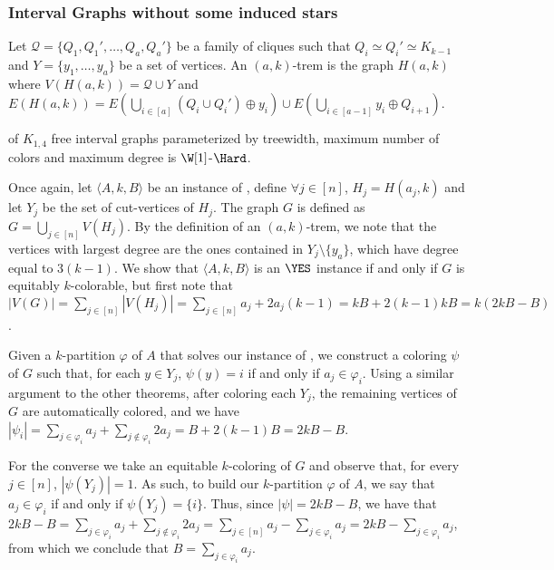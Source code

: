 \subsubsection{Interval Graphs without some induced stars}


\begin{definition}
    Let $\mathcal{Q} = \{Q_1, Q_1', \dots, Q_a, Q_a'\}$ be a family of cliques such that $Q_i \simeq Q_i' \simeq K_{k-1}$ and $Y = \{y_1, \dots, y_a\}$ be a set of vertices.
    An $(a,k)$-trem is the graph $H(a,k)$ where $V\left(H(a,k)\right) = \mathcal{Q} \cup Y$ and $E\left(H(a,k)\right) = E\left(\bigcup_{i \in [a]} (Q_i \cup Q_i') \oplus y_i\right) \cup E\left(\bigcup_{i \in [a-1]} y_i \oplus Q_{i+1}\right)$.
\end{definition}

\begin{theorem}
    \label{thm:chordal_w1_hard}
     of $K_{1,4}$ free interval graphs parameterized by treewidth, maximum number of colors and maximum degree is $\W[1]$-$\Hard$.
\end{theorem}

\begin{tproof}
    Once again, let $\langle A,k,B\rangle$ be an instance of , define $\forall j \in [n]$, $H_j = H(a_j, k)$ and let $Y_j$ be the set of cut-vertices of $H_j$.
    The graph $G$ is defined as $G = \bigcup_{j \in [n]} V(H_j)$.
    By the definition of an $(a,k)$-trem, we note that the vertices with largest degree are the ones contained in $Y_j \setminus \{y_a\}$, which have degree equal to $3(k-1)$.
    We show that $\langle A,k,B\rangle$ is an $\YES$ instance if and only if $G$ is equitably $k$-colorable, but first note that $|V(G)| = \sum_{j \in [n]} |V(H_j)| = \sum_{j \in [n]} a_j + 2a_j(k-1) = kB + 2(k-1)kB = k(2kB - B)$.
    
    Given a $k$-partition $\varphi$ of $A$ that solves our instance of , we construct a coloring $\psi$ of $G$ such that, for each $y \in Y_j$, $\psi(y) = i$ if and only if $a_j \in \varphi_i$.
    Using a similar argument to the other theorems, after coloring each $Y_j$, the remaining vertices of $G$ are automatically colored, and we have  $|\psi_i| = \sum_{j \in \varphi_i} a_j + \sum_{j \notin \varphi_i} 2a_j = B + 2(k-1)B = 2kB - B$.
    
    For the converse we take an equitable $k$-coloring of $G$ and observe that, for every $j \in [n]$, $|\psi(Y_j)| = 1$.
    As such, to build our $k$-partition $\varphi$ of $A$, we say that $a_j \in \varphi_i$ if and only if $\psi(Y_j) = \{i\}$.
    Thus, since $|\psi| = 2kB - B$, we have that $2kB - B = \sum_{j \in \varphi_i} a_j + \sum_{j \notin \varphi_i} 2a_j = \sum_{j \in [n]} a_j - \sum_{j \in \varphi_i} a_j = 2kB - \sum_{j \in \varphi_i} a_j$, from which we conclude that $B = \sum_{j \in \varphi_i} a_j$.
\end{tproof}